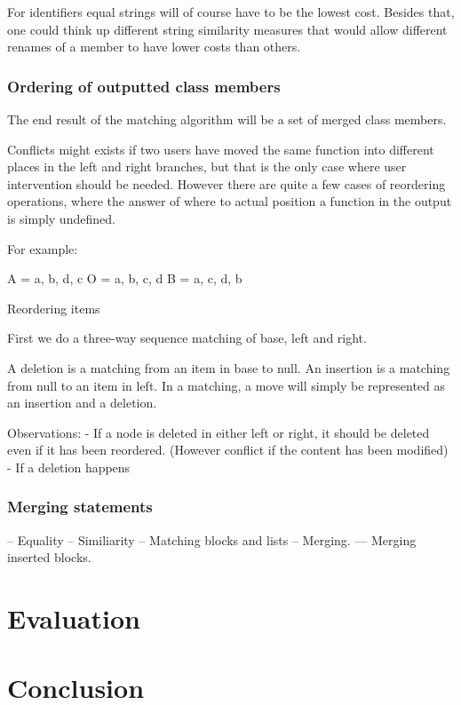 \documentclass[11pt]{article}
\begin{document}
For identifiers equal strings will of course have to be the lowest cost. Besides that, one could think up different string similarity measures that would allow different renames of a member to have lower costs than others.

\subsubsection{Ordering of outputted class members}
The end result of the matching algorithm will be a set of merged class members. 

Conflicts might exists if two users have moved the same function into different places in the left and right branches, but that is the only case where user intervention should be needed. However there are quite a few cases of reordering operations, where the answer of where to actual position a function in the output is simply undefined. 

For example:

A = { a, b, d, c }
O = { a, b, c, d }
B = { a, c, d, b }


Reordering items 

First we do a three-way sequence matching of base, left and right. 

A deletion is a matching from an item in base to null.
An insertion is a matching from null to an item in left.
In a matching, a move will simply be represented as an insertion and a deletion.



Observations:
- If a node is deleted in either left or right, it should be deleted even if it has been reordered. (However conflict if the content has been modified)
- If a deletion happens 





\subsubsection{Merging statements}


-- Equality
-- Similiarity
-- Matching blocks and lists
-- Merging.
--- Merging inserted blocks.

\clearpage
\section{Evaluation}

\clearpage
\section{Conclusion}

\clearpage



\end{document}
